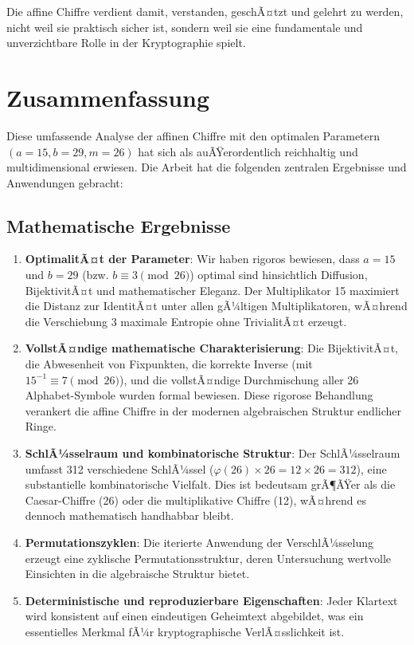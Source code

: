 ﻿\documentclass[12pt,a4paper]{article}
\begin{document}
	Die affine Chiffre verdient damit, verstanden, geschÃ¤tzt und gelehrt zu werden, nicht weil sie praktisch sicher ist, sondern weil sie eine fundamentale und unverzichtbare Rolle in der Kryptographie spielt.
	
	\section{Zusammenfassung}
	
	Diese umfassende Analyse der affinen Chiffre mit den optimalen Parametern $(a=15, b=29, m=26)$ hat sich als auÃŸerordentlich reichhaltig und multidimensional erwiesen. Die Arbeit hat die folgenden zentralen Ergebnisse und Anwendungen gebracht:
	
	\subsection{Mathematische Ergebnisse}
	
	\begin{enumerate}
		\item \textbf{OptimalitÃ¤t der Parameter}: Wir haben rigoros bewiesen, dass $a = 15$ und $b = 29$ (bzw. $b \equiv 3 \pmod{26}$) optimal sind hinsichtlich Diffusion, BijektivitÃ¤t und mathematischer Eleganz. Der Multiplikator 15 maximiert die Distanz zur IdentitÃ¤t unter allen gÃ¼ltigen Multiplikatoren, wÃ¤hrend die Verschiebung 3 maximale Entropie ohne TrivialitÃ¤t erzeugt.
		
		\item \textbf{VollstÃ¤ndige mathematische Charakterisierung}: Die BijektivitÃ¤t, die Abwesenheit von Fixpunkten, die korrekte Inverse (mit $15^{-1} \equiv 7 \pmod{26}$), und die vollstÃ¤ndige Durchmischung aller 26 Alphabet-Symbole wurden formal bewiesen. Diese rigorose Behandlung verankert die affine Chiffre in der modernen algebraischen Struktur endlicher Ringe.
		
		\item \textbf{SchlÃ¼sselraum und kombinatorische Struktur}: Der SchlÃ¼sselraum umfasst 312 verschiedene SchlÃ¼ssel ($\varphi(26) \times 26 = 12 \times 26 = 312$), eine substantielle kombinatorische Vielfalt. Dies ist bedeutsam grÃ¶ÃŸer als die Caesar-Chiffre (26) oder die multiplikative Chiffre (12), wÃ¤hrend es dennoch mathematisch handhabbar bleibt.
		
		\item \textbf{Permutationszyklen}: Die iterierte Anwendung der VerschlÃ¼sselung erzeugt eine zyklische Permutationsstruktur, deren Untersuchung wertvolle Einsichten in die algebraische Struktur bietet.
		
		\item \textbf{Deterministische und reproduzierbare Eigenschaften}: Jeder Klartext wird konsistent auf einen eindeutigen Geheimtext abgebildet, was ein essentielles Merkmal fÃ¼r kryptographische VerlÃ¤sslichkeit ist.
	\end{enumerate}
	
\end{document}
